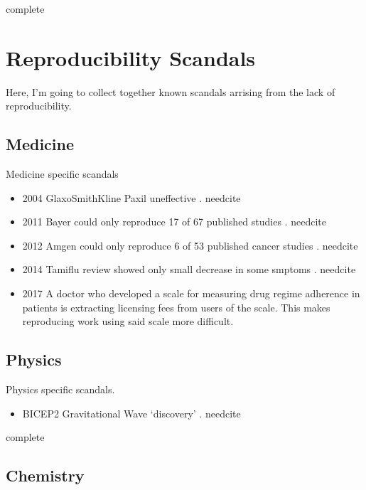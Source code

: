 \documentclass[american]{article}
\newcommand{\complete}{
	\gls{complete}
}
\newcommand{\needcite}{
	\gls{needcite}
}
\begin{document}
\complete

\section{Reproducibility Scandals} \label{sec:reproducibility-scandals}

Here, I'm going to collect together known scandals arrising from the lack of reproducibility.

\subsection{Medicine} \label{sec:scandals-medicine}

Medicine specific scandals

\begin{itemize}
\item 2004 GlaxoSmithKline Paxil uneffective \cite{dhb-zurich-hp}. \needcite
\item 2011 Bayer could only reproduce 17 of 67 published studies \cite{dhb-zurich-hp}. \needcite
\item 2012 Amgen could only reproduce 6 of 53 published cancer studies \cite{dhb-zurich-hp}. \needcite
\item 2014 Tamiflu review showed only small decrease in some smptoms \cite{dhb-zurich-hp}. \needcite
\item 2017 A doctor who developed a scale for measuring drug regime adherence in patients is extracting licensing fees from users of the scale. This makes reproducing work using said scale more difficult. \cite{marcus-payup-retract-2017}
\end{itemize}

\subsection{Physics} \label{sec:scandals-physics}

Physics specific scandals.

\begin{itemize}
\item BICEP2 Gravitational Wave `discovery' \cite{dhb-zurich-hp}. \needcite
\end{itemize}

\complete

\subsection{Chemistry} \label{sec:scandals-chemistry}
\end{document}
